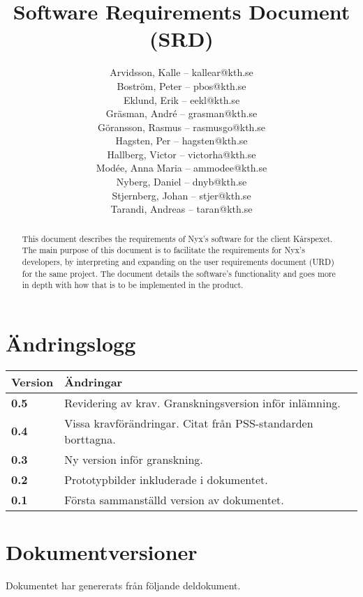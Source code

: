 \documentclass[a4paper, twoside, 11pt, titlepage]{article}
\author{
	\small
	Arvidsson, Kalle -- kallear@kth.se\\
	Boström, Peter -- pbos@kth.se\\
	Eklund, Erik -- eekl@kth.se\\
	Gräsman, André -- grasman@kth.se\\
	Göransson, Rasmus -- rasmusgo@kth.se\\
	Hagsten, Per -- hagsten@kth.se\\
	Hallberg, Victor -- victorha@kth.se\\
	Modée, Anna Maria -- ammodee@kth.se\\
	Nyberg, Daniel -- dnyb@kth.se\\
	Stjernberg, Johan -- stjer@kth.se\\
	Tarandi, Andreas -- taran@kth.se
	}
\title{Software Requirements Document (SRD)}
\begin{document}
\maketitle

\clearpage
\thispagestyle{empty}
\mbox{}
\newpage

\begin{abstract}
	This document describes the requirements of Nyx's software for the client Kårspexet. The main purpose of this document is to facilitate the requirements for Nyx's developers, by interpreting and expanding on the user requirements document (URD) for the same project. The document details the software's functionality and goes more in depth with how that is to be implemented in the product.
\end{abstract}

\newpage

\setcounter{page}{1}

\startfooter

\clearpage
\section*{Ändringslogg}


\begin {table} [ht] \begin{tabular} { p{2.6cm} p{12.5cm} }
	\hline
	\sffamily\textbf{Version} & \sffamily\textbf{Ändringar } \\
	\hline
	\sffamily\textbf{0.5} & Revidering av krav. Granskningsversion inför inlämning.  \\
	\hline
	\sffamily\textbf{0.4} & Vissa kravförändringar. Citat från PSS-standarden borttagna.  \\
	\hline
	\sffamily\textbf{0.3} & Ny version inför granskning.  \\
	\hline
	\sffamily\textbf{0.2} & Prototypbilder inkluderade i dokumentet.  \\
	\hline
	\sffamily\textbf{0.1} & Första sammanställd version av dokumentet.  \\
	\hline
\end{tabular} \end{table} \FloatBarrier


\clearpage
\section*{Dokumentversioner}


Dokumentet har genererats från följande deldokument.
\end{document}
